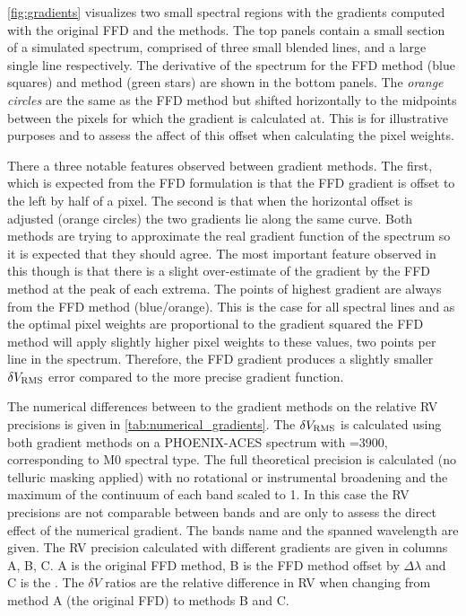 

\cref{fig:gradients} visualizes two small spectral regions with the gradients computed with the original {FFD} and the \npgradient{} methods.
The top panels contain a small section of a simulated spectrum, comprised of three small blended lines, and a large single line respectively.
The derivative of the spectrum for the {FFD} method (blue squares) and \npgradient{} method (green stars) are shown in the bottom panels.
The \emph{orange circles} are the same as the {FFD} method but shifted horizontally to the midpoints between the pixels for which the gradient is calculated at.
This is for illustrative purposes and to assess the affect of this offset when calculating the pixel weights.

There a three notable features observed between gradient methods.
The first, which is expected from the {FFD} formulation is that the {FFD} gradient is offset to the left by half of a pixel.
The second is that when the horizontal offset is adjusted (orange circles) the two gradients lie along the same curve.
Both methods are trying to approximate the real gradient function of the spectrum so it is expected that they should agree.
The most important feature observed in this though is that there is a slight over-estimate of the gradient by the {FFD} method at the peak of each extrema.
The points of highest gradient are always from the {FFD} method (blue/orange).
This is the case for all spectral lines and as the optimal pixel weights are proportional to the gradient squared the {FFD} method will apply slightly higher pixel weights to these values, two points per line in the spectrum.
Therefore, the {FFD} gradient produces a slightly smaller \(\delta V_{\textrm{RMS}}\) error compared to the more precise gradient function.

The numerical differences between to the gradient methods on the relative {RV} precisions is given in \cref{tab:numerical_gradients}.
The \(\delta V_{\textrm{RMS}}\) is calculated using both gradient methods on a {PHOENIX-ACES} spectrum with \Teff{}=3900\K{}, corresponding to {{M0}} spectral type.
The full theoretical precision is calculated (no telluric masking applied) with no rotational or instrumental broadening and the maximum of the continuum of each band scaled to 1.
In this case the {RV} precisions are not comparable between bands and are only to assess the direct effect of the numerical gradient.
The bands name and the spanned wavelength are given.
The {RV} precision calculated with different gradients are given in columns A, B, C.
A is the original {FFD} method, B is the {FFD} method offset by \(\Delta\lambda\) and C is the \npgradient{}.
The \(\delta V\) ratios are the relative difference in {RV} when changing from method A (the original {FFD}) to methods B and C.

